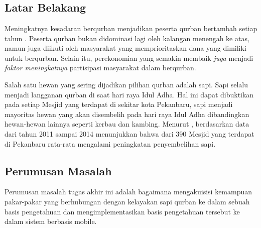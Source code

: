 %
%
%
%

\chapter{\babI}

\section{Latar Belakang}
Meningkatnya kesadaran berqurban menjadikan peserta qurban bertambah setiap tahun \cite{mangalagowri2016eeg}. Peserta qurban bukan didominasi lagi oleh kalangan menengah ke atas, namun juga diikuti oleh masyarakat yang memprioritaskan dana yang dimiliki untuk berqurban. Selain itu, perekonomian yang semakin membaik \textit{juga} menjadi \textit{faktor meningkatnya} partisipasi masyarakat dalam berqurban.

Salah satu hewan yang sering dijadikan pilihan qurban adalah sapi. Sapi selalu menjadi langganan qurban di saat hari raya Idul Adha. Hal ini dapat dibuktikan pada setiap Mesjid yang terdapat di sekitar kota Pekanbaru, sapi menjadi mayoritas hewan yang akan disembelih pada hari raya Idul Adha dibandingkan hewan-hewan lainnya seperti kerbau dan kambing. Menurut , berdasarkan data dari tahun 2011 sampai 2014 menunjukkan bahwa dari 390 Mesjid yang terdapat di Pekanbaru rata-rata mengalami peningkatan penyembelihan sapi.


\section{Perumusan Masalah}
Perumusan masalah tugas akhir ini adalah bagaimana mengakuisisi kemampuan pakar-pakar yang berhubungan dengan kelayakan sapi qurban ke dalam sebuah basis pengetahuan dan mengimplementasikan basis pengetahuan tersebut ke dalam sistem berbasis mobile.


